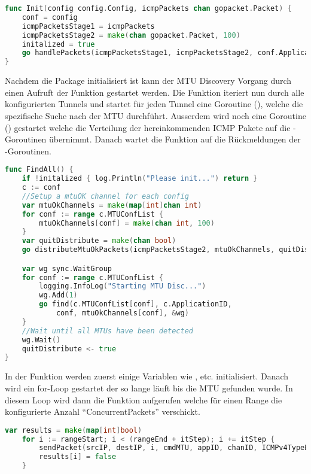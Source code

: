 \begin{lstlisting}[language=go, caption=mtu.Init(..) Funktion]                    
func Init(config config.Config, icmpPackets chan gopacket.Packet) {
	conf = config
	icmpPacketsStage1 = icmpPackets
	icmpPacketsStage2 = make(chan gopacket.Packet, 100)
	initalized = true
	go handlePackets(icmpPacketsStage1, icmpPacketsStage2, conf.ApplicationID)
}
\end{lstlisting}

Nachdem die Package initialisiert ist kann der \ac{MTU} Discovery Vorgang durch einen Aufruft der  Funktion gestartet werden. Die  Funktion iteriert nun durch alle konfigurierten Tunnels und startet für jeden Tunnel eine Goroutine (), welche die spezifische Suche nach der \ac{MTU} durchführt.
Ausserdem wird noch eine Goroutine () gestartet welche die Verteilung der hereinkommenden \ac{ICMP} Pakete auf die -Goroutinen übernimmt.
Danach wartet die  Funktion auf die Rückmeldungen der -Goroutinen.

\begin{lstlisting}[language=go, caption=mtu.FindAll(..) Funktion]                    
func FindAll() {
	if !initalized { log.Println("Please init...") return }
	c := conf
	//Setup a mtuOK channel for each config
	var mtuOkChannels = make(map[int]chan int)
	for conf := range c.MTUConfList {
		mtuOkChannels[conf] = make(chan int, 100)
	}
	var quitDistribute = make(chan bool)
	go distributeMtuOkPackets(icmpPacketsStage2, mtuOkChannels, quitDistribute)

	var wg sync.WaitGroup
	for conf := range c.MTUConfList {
		logging.InfoLog("Starting MTU Disc...")
		wg.Add(1)
		go find(c.MTUConfList[conf], c.ApplicationID,
			conf, mtuOkChannels[conf], &wg)
	}
	//Wait until all MTUs have been detected
	wg.Wait()
	quitDistribute <- true
}
\end{lstlisting}

In der  Funktion werden zuerst einige Variablen wie ,  etc. initialisiert. Danach wird ein for-Loop gestartet der so lange läuft bis die \ac{MTU} gefunden wurde. In diesem Loop wird dann die  Funktion aufgerufen welche für einen Range die konfigurierte Anzahl \enquote{ConcurrentPackets} verschickt.

\begin{lstlisting}[language=go, caption=Ein Batch von Paketen verschicken]                    
	var results = make(map[int]bool)
	for i := rangeStart; i < (rangeEnd + itStep); i += itStep {
		sendPacket(srcIP, destIP, i, cmdMTU, appID, chanID, ICMPv4TypeEchoRequest)
		results[i] = false
	}
\end{lstlisting}

